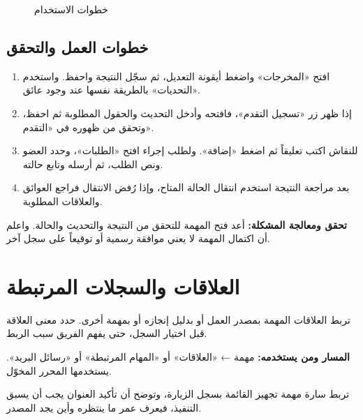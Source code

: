 \begin{figure}[H]
\centering
{}
\rclegend
\caption{خطوات الاستخدام}
\label{fig:tasks-follow-up-flow}
\end{figure}

\subsection{خطوات العمل والتحقق}
\begin{enumerate}
\item افتح «المخرجات» واضغط أيقونة التعديل، ثم سجّل النتيجة واحفظ. واستخدم «التحديات» بالطريقة نفسها عند وجود عائق.
\item إذا ظهر زر «تسجيل التقدم»، فافتحه وأدخل التحديث والحقول المطلوبة ثم احفظ، وتحقق من ظهوره في «التقدم».
\item للنقاش اكتب تعليقاً ثم اضغط «إضافة». ولطلب إجراء افتح «الطلبات»، وحدد العضو ونص الطلب، ثم أرسله وتابع حالته.
\item بعد مراجعة النتيجة استخدم انتقال الحالة المتاح، وإذا رُفض الانتقال فراجع العوائق والعلاقات المطلوبة.
\end{enumerate}

\textbf{تحقق ومعالجة المشكلة:} أعد فتح المهمة للتحقق من النتيجة والتحديث والحالة. واعلم أن اكتمال المهمة لا يعني موافقة رسمية أو توقيعاً على سجل آخر.

\clearpage
\section{العلاقات والسجلات المرتبطة}
\label{sec:tasks-feature-relationships}

تربط العلاقات المهمة بمصدر العمل أو بدليل إنجازه أو بمهمة أخرى. حدد معنى العلاقة قبل اختيار السجل، حتى يفهم الفريق سبب الربط.

\textbf{المسار ومن يستخدمه:} مهمة ← «العلاقات» أو «المهام المرتبطة» أو «رسائل البريد». يستخدمها المحرر المخوّل.

\begin{rcnote}
تربط سارة مهمة تجهيز القائمة بسجل الزيارة، وتوضح أن تأكيد العنوان يجب أن يسبق التنفيذ، فيعرف عمر ما ينتظره وأين يجد المصدر.
\end{rcnote}

